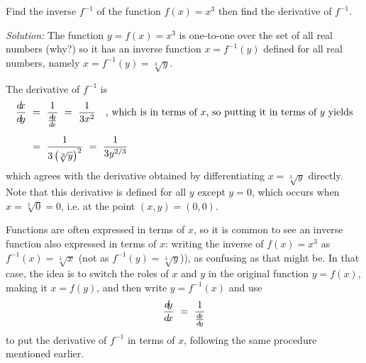 \begin{exmp}\label{exmp:invderiv}
 Find the inverse $f^{-1}$ of the function $f(x) = x^3$ then find the derivative
 of $f^{-1}$.\vspace{1mm}
 \par\noindent\emph{Solution:} The function $y = f(x) = x^3$ is one-to-one over
 the set of all real numbers (why?) so it has an inverse function $x = f^{-1}(y)$
 defined for all real numbers, namely $x = f^{-1}(y) = \sqrt[3]{y}$.\vspace{1mm}
 
 \par\noindent The derivative of $f^{-1}$ is
 \begin{align*}
  \frac{d\negmedspace x}{d\!y} ~&=~ \frac{1}{\frac{d\negmedspace y}{d\!x}} ~=~ \frac{1}{3x^2} \quad\text{, which is in terms of $x$,
             so putting it in terms of $y$ yields}\\[6pt]
         &=~ \frac{1}{3 \left(\sqrt[3]{y}\right)^2} ~=~
		     \frac{1}{3 y^{2/3}}
 \end{align*}
 which agrees with the derivative obtained by differentiating $x = \sqrt[3]{y}$
 directly. Note that this derivative is defined for all $y$ except $y = 0$,
 which occurs when $x = \sqrt[3]{0} = 0$, i.e. at the point $(x,y) = (0,0)$.
\end{exmp}
\divider
\vspace{3mm}

Functions are often expressed in terms of $x$, so it is common to see an
inverse function also expressed in terms of $x$: writing the inverse
of $f(x) = x^3$ as $f^{-1}(x) = \sqrt[3]{x}$ (not as
$f^{-1}(y) = \sqrt[3]{y}$)), as confusing as that might be. In that case, the
idea is to switch the roles of $x$ and $y$ in the original function $y = f(x)$,
making it $x = f(y)$, and then write $y = f^{-1}(x)$ and use
\[
 \frac{d\negmedspace y}{d\!x} ~=~ \frac{1}{\frac{d\negmedspace x}{d\!y}}
\]
to put the derivative of $f^{-1}$ in terms of $x$, following the same procedure
mentioned earlier.

